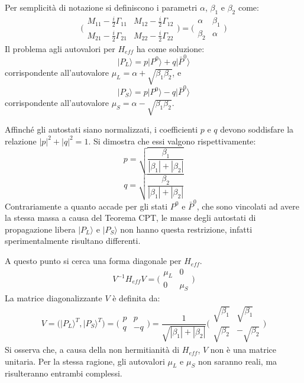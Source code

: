 Per semplicità di notazione si definiscono i parametri $\alpha$, $\beta_1$ e $\beta_2$ come:
\begin{equation}
\Big( \begin{matrix} M_{11}-\frac{i}{2}\Gamma_{11} & M_{12}-\frac{i}{2}\Gamma_{12} \\ M_{21}-\frac{i}{2}\Gamma_{21} & M_{22}-\frac{i}{2}\Gamma_{22} \end{matrix}\Big) = \Big( \begin{matrix} \alpha & \beta_1 \\ \beta_2 & \alpha  \end{matrix}\Big)
\end{equation}
Il problema agli autovalori per $H_{eff}$ ha come soluzione:
\begin{equation}
 |P_L\rangle = p|P^0\rangle + q|\bar{P}^0\rangle
\end{equation}
corrispondente all'autovalore $\mu_L = \alpha + \sqrt{\beta_1\beta_2}$, e
\begin{equation}
 |P_S\rangle = p|P^0\rangle - q|\bar{P}^0\rangle
\end{equation}
corrispondente all'autovalore $\mu_S = \alpha - \sqrt{\beta_1\beta_2}$.

Affinché gli autostati siano normalizzati, i coefficienti $p$ e $q$ devono soddisfare la relazione ${|p|}^2 +{|q|}^2 = 1$.
Si dimostra che essi valgono rispettivamente:
\begin{equation}
 p = \sqrt{\frac{\beta_1}{|\beta_1|+|\beta_2|}}
\end{equation}
\begin{equation}
 q = \sqrt{\frac{\beta_2}{|\beta_1|+|\beta_2|}}
\end{equation}
%
%
Contrariamente a quanto accade per gli stati $P^0$ e $\bar{P}^0$, che sono vincolati ad avere la stessa massa a causa del Teorema CPT, le masse degli autostati di 
propagazione libera $|P_L\rangle$ e $|P_S\rangle$ non hanno questa restrizione, infatti sperimentalmente risultano differenti.

A questo punto si cerca una forma diagonale per $H_{eff}$. 
\begin{equation}
V^{-1}H_{eff}V = \Big( \begin{matrix} \mu_L & 0 \\ 0 & \mu_S \end{matrix}\Big)
\end{equation}
La matrice diagonalizzante $V$ è definita da:
\begin{equation}
 V = \Big({|P_L\rangle}^T , {|P_S\rangle}^T\Big) = \Big( 
\begin{matrix} p & p \\ q & -q \end{matrix} \Big) = \frac{1}{\sqrt{|\beta_1|+|\beta_2|}}\Big( 
\begin{matrix} \sqrt{\beta_1} & \sqrt{\beta_1} \\ \sqrt{\beta_2} & -\sqrt{\beta_2} \end{matrix}\Big)
\end{equation}
Si osserva che, a causa della non hermitianità di $H_{eff}$, $V$ non è una matrice unitaria. 
Per la stessa ragione, gli autovalori $\mu_L$ e $\mu_S$ non saranno reali, ma risulteranno entrambi complessi.

